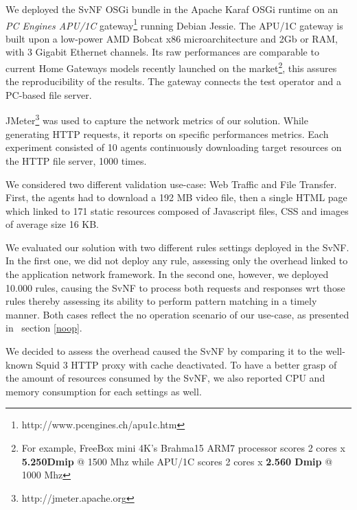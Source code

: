 We deployed the SvNF OSGi bundle in the Apache Karaf OSGi runtime on an \textit{PC Engines APU/1C} gateway\footnote{http://www.pcengines.ch/apu1c.htm} running Debian Jessie. 
The APU/1C gateway is built upon a low-power AMD Bobcat x86 microarchitecture and 2Gb or RAM, with 3 Gigabit Ethernet channels. Its raw performances are comparable to current Home Gateways models recently launched on the market\footnote{For example, FreeBox mini 4K's Brahma15 ARM7 processor scores 2 cores x \textbf{5.250Dmip} @ 1500 Mhz while APU/1C scores 2 cores x \textbf{2.560 Dmip} @ 1000 Mhz}, this assures the reproducibility of the results. The gateway connects the test operator and a PC-based file server.




JMeter\footnote{http://jmeter.apache.org} was used to capture the network metrics of our solution.
While generating HTTP requests, it reports on specific performances metrics. Each experiment consisted of 10 agents continuously downloading target resources on the HTTP file server, 1000 times.

We considered two different validation use-case: Web Traffic and File Transfer. First, the agents had to download a 192 MB video file, then a single HTML page which linked to 171 static resources composed of Javascript files, CSS and images of average size 16 KB.

We evaluated our solution with two different rules settings deployed in the SvNF. In the first one, we did not deploy any rule, assessing only the overhead linked to the application network framework. In the second one, however, we deployed 10.000 rules, causing the SvNF to process both requests and responses wrt those rules thereby assessing its ability to perform pattern matching in a timely manner. Both cases reflect the no operation scenario of our use-case, as  presented in ~section \ref{noop}.

We decided to assess the overhead caused the SvNF by comparing it to the well-known Squid 3 HTTP proxy with cache deactivated. To have a better grasp of the amount of resources consumed by the SvNF, we also reported CPU and memory consumption for each settings as well.

